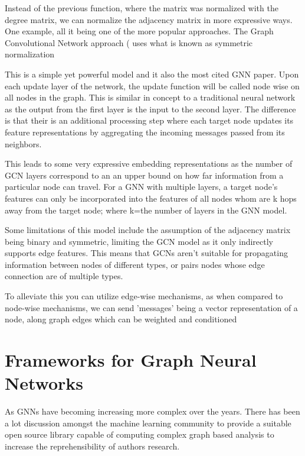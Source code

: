 
Instead of the previous function, where the matrix was normalized with the degree matrix, we can normalize the adjacency matrix in more expressive ways. One example, all it being one of the more popular approaches. The Graph Convolutional Network approach (\cite{kipf17} uses what is known as symmetric normalization 



This is a simple yet powerful model and it also the most cited GNN paper. Upon each update layer of the network, the update function will be called node wise on all nodes in the graph. This is similar in concept to a traditional neural network as the output from the first layer is the input to the second layer. The difference is that their is an additional processing step where each target node updates its feature representations by aggregating the incoming messages passed from its neighbors.

This leads to some very expressive embedding representations as the number of GCN layers correspond to an an upper bound on how far information from a particular node can travel. For a GNN with multiple layers, a target node's features can only be incorporated into the features of all nodes whom are k hops away from the target node; where k=the number of layers in the GNN model.

Some limitations of this model include the assumption of the adjacency matrix being binary and symmetric, limiting the GCN model as it only indirectly supports edge features. This means that GCNs aren't suitable for propagating information between nodes of different types, or pairs nodes whose edge connection are of multiple types. 

To alleviate this you can utilize edge-wise mechanisms, as when compared to node-wise mechanisms, we can send 'messages' being a vector representation of a node, along graph edges which can be weighted and conditioned

\section{Frameworks for Graph Neural Networks}

As GNNs have becoming increasing more complex over the years. There has been a lot discussion amongst the machine learning community to provide a suitable open source library capable of computing complex graph based analysis to increase the reprehensibility of authors research.

